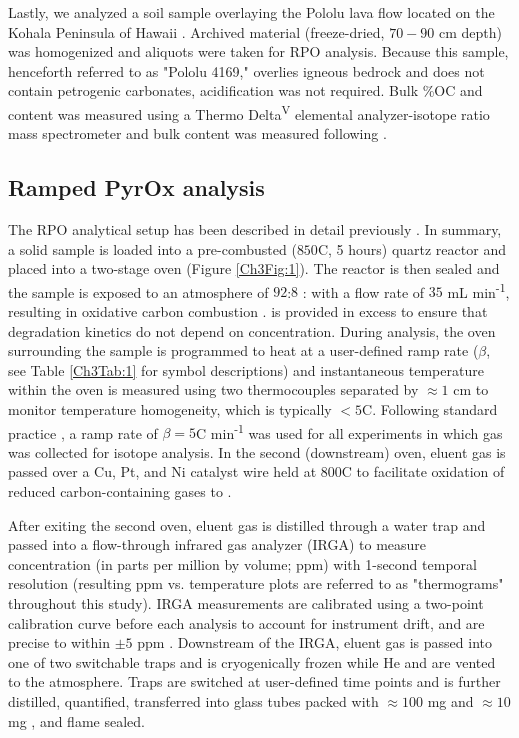 Lastly, we analyzed a soil sample overlaying the Pololu lava flow located on the Kohala Peninsula of Hawaii \citep[$20.15$\textdegree N, $155.83$\textdegree W;][]{Chadwick:2007hc}. Archived material (freeze-dried, $70 - 90$ cm depth) was homogenized and aliquots were taken for RPO analysis. Because this sample, henceforth referred to as "Pololu 4169," overlies igneous bedrock and does not contain petrogenic carbonates, acidification was not required. Bulk \%OC and  content was measured using a Thermo Delta\textsuperscript{V} elemental analyzer-isotope ratio mass spectrometer and bulk  content was measured following \citet{McNichol:1994ty}.

\subsection{Ramped PyrOx analysis}

The RPO analytical setup has been described in detail previously \citep{Rosenheim:2008ed,Hemingway:2016rc}. In summary, a solid sample is loaded into a pre-combusted ($850$\textdegree C, 5 hours) quartz reactor and placed into a two-stage oven (Figure \ref{Ch3Fig:1}). The reactor is then sealed and the sample is exposed to an atmosphere of $92$:$8$ : with a flow rate of $35$ mL min\textsuperscript{-1}, resulting in oxidative carbon combustion \citep[\textit{c.f.} pyrolysis as described in][]{Rosenheim:2008ed}.  is provided in excess to ensure that degradation kinetics do not depend on  concentration. During analysis, the oven surrounding the sample is programmed to heat at a user-defined ramp rate ($\beta$, see Table \ref{Ch3Tab:1} for symbol descriptions) and instantaneous temperature within the oven is measured using two thermocouples separated by $\approx 1$ cm to monitor temperature homogeneity, which is typically $< 5$\textdegree C. Following standard practice \citep{Rosenheim:2008ed}, a ramp rate of $\beta = 5$\textdegree C min\textsuperscript{-1} was used for all experiments in which  gas was collected for isotope analysis. In the second (downstream) oven, eluent gas is passed over a Cu, Pt, and Ni catalyst wire held at $800$\textdegree C to facilitate oxidation of reduced carbon-containing gases to . 

After exiting the second oven, eluent gas is distilled through a water trap and passed into a flow-through infrared gas analyzer (IRGA) to measure  concentration (in parts per million by volume; ppm) with 1-second temporal resolution (resulting ppm vs. temperature plots are referred to as "thermograms" throughout this study). IRGA measurements are calibrated using a two-point calibration curve before each analysis to account for instrument drift, and are precise to within $\pm 5$ ppm \citep{Hemingway:2016rc}. Downstream of the IRGA, eluent gas is passed into one of two switchable traps and  is cryogenically frozen while He and  are vented to the atmosphere. Traps are switched at user-defined time points and  is further distilled, quantified, transferred into glass tubes packed with $\approx 100$ mg  and $\approx 10$ mg , and flame sealed. 


